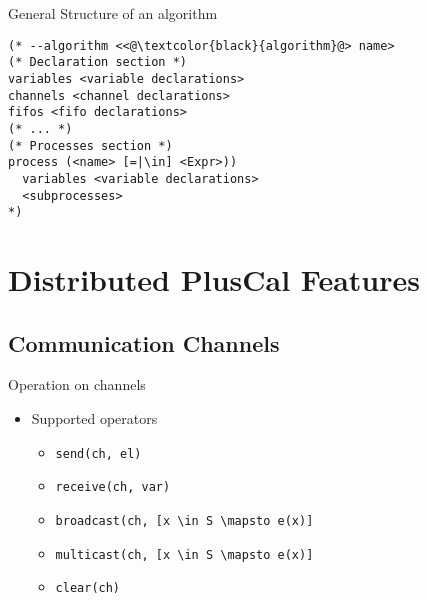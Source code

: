 \documentclass{beamer}
\begin{document}
\begin{frame}[fragile]{General Structure of an algorithm}
\begin{lstlisting}[language=pluscal, frame = tlrb, numbers = none]
(* --algorithm <<@\textcolor{black}{algorithm}@> name>
(* Declaration section *)
variables <variable declarations>
channels <channel declarations>
fifos <fifo declarations>
(* ... *)
(* Processes section *)
process (<name> [=|\in] <Expr>))
  variables <variable declarations>
  <subprocesses>
*)
\end{lstlisting}
\end{frame}

\section{Distributed PlusCal Features}

\subsection{Communication Channels}

\begin{frame}[fragile]{Operation on channels}
    \begin{itemize}
     \item Supported operators 
            \begin{itemize}
                \item \verb|send(ch, el)|
                \item \verb|receive(ch, var)|
                \item \verb|broadcast(ch, [x \in S \mapsto e(x)]| 
                \item \verb|multicast(ch, [x \in S \mapsto e(x)]|
                \item \verb|clear(ch)|
            \end{itemize}

    \end{itemize}
\end{frame}
\end{document}
